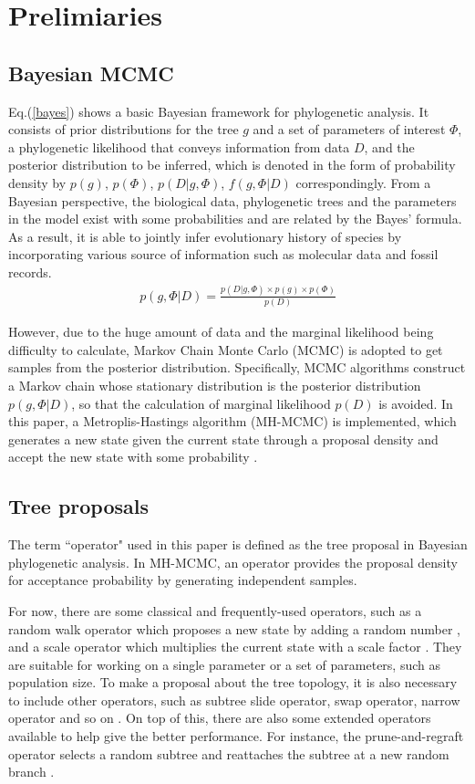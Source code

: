 \documentclass{bmcart}
\begin{document}
\section*{Prelimiaries}
\subsection*{Bayesian MCMC}
Eq.(\ref{bayes}) shows a basic Bayesian framework for phylogenetic analysis. It consists of prior distributions for the tree $g$ and a set of parameters of interest $\Phi $, a phylogenetic likelihood that conveys information from data $D$, and the posterior distribution to be inferred, which is denoted in the form of probability density by $p(g) $, $p(\Phi )$, $p(D|g,\Phi )$, $f(g,\Phi |D)$ correspondingly. From a Bayesian perspective, the biological data, phylogenetic trees and the parameters in the model exist with some probabilities and are related by the Bayes' formula. As a result, it is able to jointly infer evolutionary history of species  by incorporating various source of information such as molecular data and fossil records.
\begin{eqnarray}\label{bayes}
p(g,\Phi |D) = \frac{{p (D|g,\Phi ) \times p (g) \times p (\Phi )}}{{p (D)}}
\end{eqnarray}

However, due to the huge amount of data and the marginal likelihood being difficulty to calculate, Markov Chain Monte Carlo (MCMC) is adopted to get samples from the posterior distribution. Specifically, MCMC algorithms construct a Markov chain whose stationary distribution is the posterior distribution $p(g,\Phi |D)$, so that the calculation of marginal likelihood $p (D)$ is avoided. In this paper, a Metroplis-Hastings algorithm (MH-MCMC) is implemented, which generates a new state given the current state through a proposal density and accept the new state with some probability \cite{metropolis1953equation,hastings1970monte}.
\subsection*{Tree proposals}
\label{treeproposals}
The term ``operator" used in this paper is defined as the tree proposal in Bayesian phylogenetic analysis. In MH-MCMC, an operator provides the proposal density for acceptance probability by generating independent samples. 

For now, there are some classical and frequently-used operators, such as a random walk operator which proposes a new state by adding a random number \cite{suchard2005stochastic}, and a scale operator which multiplies the current state with a scale factor \cite{higuchi1997monte}. They are suitable for working on a single parameter or a set of parameters, such as population size. To make a proposal about the tree topology, it is also necessary to include other operators, such as subtree slide operator, swap operator, narrow operator and so on \cite{hohna2008clock}. On top of this, there are also some extended operators available to help give the better performance. For instance, the prune-and-regraft operator selects a random subtree and reattaches the subtree at a new random branch \cite{hohna2011guided}. 
\end{document}
